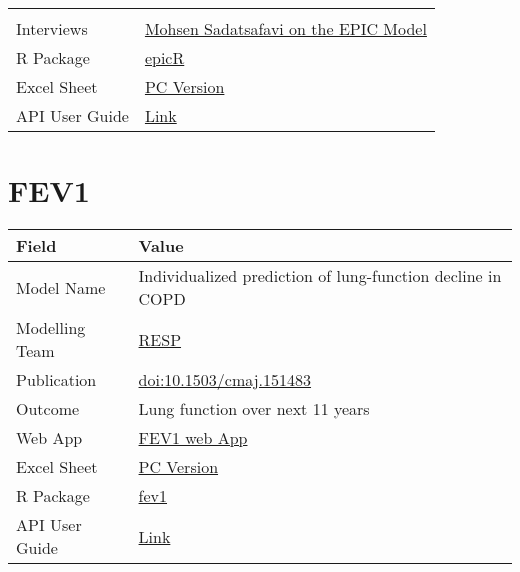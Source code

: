 \documentclass[
]{book}
\begin{document}
\begin{longtable}[]{@{}ll@{}}
\begin{minipage}[t]{0.49\columnwidth}
\end{minipage}\tabularnewline
\begin{minipage}[t]{0.45\columnwidth}\raggedright
Interviews\strut
\end{minipage} & \begin{minipage}[t]{0.49\columnwidth}\raggedright
\href{https://www.peermodelsnetwork.com/post/interview-with-mohsen-sadatsafavi}{Mohsen Sadatsafavi on the EPIC Model}\strut
\end{minipage}\tabularnewline
\begin{minipage}[t]{0.45\columnwidth}\raggedright
R Package\strut
\end{minipage} & \begin{minipage}[t]{0.49\columnwidth}\raggedright
\href{https://github.com/resplab/epicR}{epicR}\strut
\end{minipage}\tabularnewline
\begin{minipage}[t]{0.45\columnwidth}\raggedright
Excel Sheet\strut
\end{minipage} & \begin{minipage}[t]{0.49\columnwidth}\raggedright
\href{https://drive.google.com/uc?export=download\&id=15yY_O7wVgoEbaHNLDBjfN2PqnenB6WWa}{PC Version}\strut
\end{minipage}\tabularnewline
\begin{minipage}[t]{0.45\columnwidth}\raggedright
API User Guide\strut
\end{minipage} & \begin{minipage}[t]{0.49\columnwidth}\raggedright
\href{https://resplab.github.io/prismguide/api-users-guide.html\#epic}{Link}\strut
\end{minipage}\tabularnewline
\bottomrule
\end{longtable}

\hypertarget{fev1}{%
\chapter{FEV1}\label{fev1}}

\begin{longtable}[]{@{}ll@{}}
\toprule
Field & Value\tabularnewline
\midrule
\endhead
Model Name & Individualized prediction of lung-function decline in COPD\tabularnewline
Modelling Team & \href{http://resp.core.ubc.ca}{RESP}\tabularnewline
Publication & \href{https://doi.org/10.1503/cmaj.151483}{doi:10.1503/cmaj.151483}\tabularnewline
Outcome & Lung function over next 11 years\tabularnewline
Web App & \href{http://resp.core.ubc.ca/ipress/FEV1Pred}{FEV1 web App}\tabularnewline
Excel Sheet & \href{https://drive.google.com/uc?export=download\&id=1--OGtwrKHuQeUqaYMQ3CISvnTODQbF_I}{PC Version}\tabularnewline
R Package & \href{https://github.com/resplab/fev1}{fev1}\tabularnewline
API User Guide & \href{https://resplab.github.io/prismguide/api-users-guide.html\#fev1}{Link}\tabularnewline
\bottomrule
\end{longtable}
\end{document}
